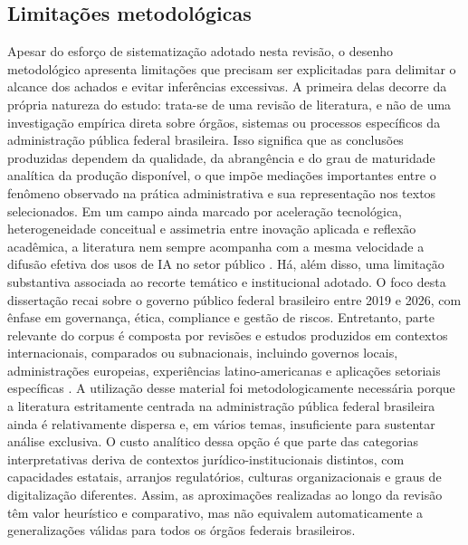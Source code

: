 \documentclass[12pt,a4paper]{article}
\begin{document}
\subsection{Limitações metodológicas}
\label{sec:org2d79a4b}
Apesar do esforço de sistematização adotado nesta revisão, o desenho metodológico apresenta limitações que precisam ser explicitadas para delimitar o alcance dos achados e evitar inferências excessivas. A primeira delas decorre da própria natureza do estudo: trata-se de uma revisão de literatura, e não de uma investigação empírica direta sobre órgãos, sistemas ou processos específicos da administração pública federal brasileira. Isso significa que as conclusões produzidas dependem da qualidade, da abrangência e do grau de maturidade analítica da produção disponível, o que impõe mediações importantes entre o fenômeno observado na prática administrativa e sua representação nos textos selecionados. Em um campo ainda marcado por aceleração tecnológica, heterogeneidade conceitual e assimetria entre inovação aplicada e reflexão acadêmica, a literatura nem sempre acompanha com a mesma velocidade a difusão efetiva dos usos de IA no setor público \autocite{madan2022ai} \autocite{criado2024artificial}.
Há, além disso, uma limitação substantiva associada ao recorte temático e institucional adotado. O foco desta dissertação recai sobre o governo público federal brasileiro entre 2019 e 2026, com ênfase em governança, ética, compliance e gestão de riscos. Entretanto, parte relevante do corpus é composta por revisões e estudos produzidos em contextos internacionais, comparados ou subnacionais, incluindo governos locais, administrações europeias, experiências latino-americanas e aplicações setoriais específicas \autocite{yiitcanlar2022artificial} \autocite{david2023understanding} \autocite{criado2024inteligencia}. A utilização desse material foi metodologicamente necessária porque a literatura estritamente centrada na administração pública federal brasileira ainda é relativamente dispersa e, em vários temas, insuficiente para sustentar análise exclusiva. O custo analítico dessa opção é que parte das categorias interpretativas deriva de contextos jurídico-institucionais distintos, com capacidades estatais, arranjos regulatórios, culturas organizacionais e graus de digitalização diferentes. Assim, as aproximações realizadas ao longo da revisão têm valor heurístico e comparativo, mas não equivalem automaticamente a generalizações válidas para todos os órgãos federais brasileiros.
\end{document}
